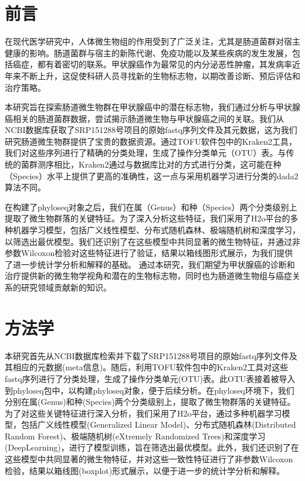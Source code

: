 \documentclass[
]{article}
\author{}
\date{\vspace{-2.5em}}
\begin{document}
\section{前言}\label{ux524dux8a00}

在现代医学研究中，人体微生物组的作用受到了广泛关注，尤其是肠道菌群对宿主健康的影响。肠道菌群与宿主的新陈代谢、免疫功能以及某些疾病的发生发展，包括癌症，都有着密切的联系。甲状腺癌作为最常见的内分泌恶性肿瘤，其发病率近年来不断上升，这促使科研人员寻找新的生物标志物，以期改善诊断、预后评估和治疗策略。

本研究旨在探索肠道微生物群在甲状腺癌中的潜在标志物，我们通过分析与甲状腺癌相关的肠道菌群数据，尝试揭示肠道微生物与甲状腺癌之间的关联。我们从NCBI数据库获取了SRP151288号项目的原始fastq序列文件及其元数据，这为我们研究肠道微生物群提供了宝贵的数据资源。通过TOFU软件包中的Kraken2工具，我们对这些序列进行了精确的分类处理，生成了操作分类单元（OTU）表。与传统的菌群测序相比，Kraken2通过与数据库比对的方式进行分类，这可能在种（Species）水平上提供了更高的准确性，这一点与采用机器学习进行分类的dada2算法不同。

在构建了phyloseq对象之后，我们在属（Genus）和种（Species）两个分类级别上提取了微生物群落的关键特征。为了深入分析这些特征，我们采用了H2o平台的多种机器学习模型，包括广义线性模型、分布式随机森林、极端随机树和深度学习，以筛选出最优模型。我们还识别了在这些模型中共同显著的微生物特征，并通过非参数Wilcoxon检验对这些特征进行了验证，结果以箱线图形式展示，为我们提供了进一步统计学分析和解释的基础。
通过本研究，我们期望为甲状腺癌的诊断和治疗提供新的微生物学视角和潜在的生物标志物，同时也为肠道微生物组与癌症关系的研究领域贡献新的知识。

\section{方法学}\label{ux65b9ux6cd5ux5b66}

本研究首先从NCBI数据库检索并下载了SRP151288号项目的原始fastq序列文件及其相应的元数据(meta信息)。随后，利用TOFU软件包中的Kraken2工具对这些fastq序列进行了分类处理，生成了操作分类单元(OTU)表。此OTU表接着被导入到phyloseq包中，以构建phyloseq对象，便于后续分析。在phyloseq环境下，我们分别在属(Genus)和种(Species)两个分类级别上，提取了微生物群落的关键特征。为了对这些关键特征进行深入分析，我们采用了H2o平台，通过多种机器学习模型，包括广义线性模型(Generalized
Linear Model)、分布式随机森林(Distributed Random
Forest)、极端随机树(eXtremely Randomized
Trees)和深度学习(DeepLearning)，进行了模型训练，旨在筛选出最优模型。此外，我们还识别了在这些模型中共同显著的微生物特征，并对这些一致性特征进行了非参数Wilcoxon检验，结果以箱线图(boxplot)形式展示，以便于进一步的统计学分析和解释。
\end{document}
